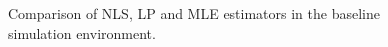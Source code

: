 \documentclass[10pt]{article}
\begin{document}
\begin{figure}
  \begin{subfigure}
    \centering
    \resizebox{1.1\linewidth}{!}{}
  \end{subfigure}
  \hfill
  \begin{subfigure}
    \centering
    \resizebox{1.1\linewidth}{!}{}
  \end{subfigure}
  \hfill
  \begin{subfigure}
    \centering
    \resizebox{1.1\linewidth}{!}{}
  \end{subfigure}
  \caption{Comparison of NLS, LP and MLE estimators in the baseline simulation environment.}
\end{figure}
\end{document}
